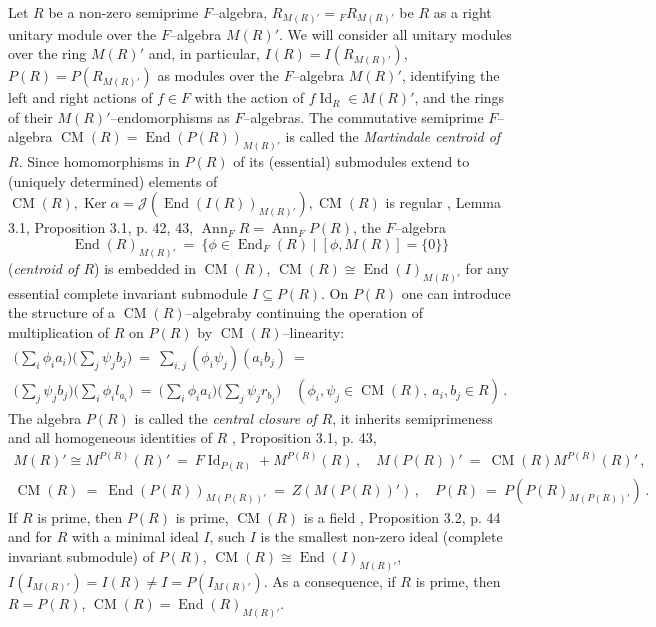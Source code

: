 \documentclass[a4paper,11pt]{article}
\DeclareMathOperator{\Id}{Id}
\DeclareMathOperator{\Ker}{Ker}
\DeclareMathOperator{\End}{End}
\DeclareMathOperator{\CM}{CM}
\DeclareMathOperator{\Ann}{Ann}
\begin{document}
Let $R$ be a non-zero semiprime $F$--algebra, ${R_{M(R)'}={}_F R_{M(R)'}}$ be 
$R$ as a right unitary module over the $F$--algebra $M(R)'$. We will consider 
all unitary modules over the ring $M(R)'$ and, in particular, 
${I(R)=I(R_{M(R)'})}$, ${P(R)=P(R_{M(R)'})}$ as modules over the $F$--algebra 
$M(R)'$, identifying the left and right actions of ${f\in F}$ with the 
action of ${f \Id_R\in M(R)'}$, and the rings of their $M(R)'$--endomorphisms 
as $F$--algebras. The commutative semiprime $F$--algebra 
${\CM(R)=\End(P(R))_{M(R)'}}$ is called the \emph{Martindale centroid of $R$}. 
Since homomorphisms in $P(R)$ of its (essential) submodules extend to 
(uniquely determined) elements of 
${\CM(R), \Ker \alpha=\mathcal{J}(\End(I(R))_{M(R)'}), \CM(R)}$ is regular 
\cite{Raz}, Lemma 3.1, Proposition 3.1, p. 42, 43, 
${\Ann_F R=\Ann_F P(R)}$, the $F$--algebra  
\[
\End(R)_{M(R)'}\ =\ \{\phi\in \End_F(R)\mid [\phi, M(R)]=\{0\}\} 
\]
(\emph{centroid of $R$}) is embedded in $\CM(R)$, 
${\CM(R)\cong \End(I)_{M(R)'}}$ for any essential complete invariant 
submodule ${I\subseteq P(R)}$. On $P(R)$ one can introduce the structure of 
a $\CM(R)$--algebra\linebreak by continuing the operation of multiplication of 
$R$ on $P(R)$ by $\CM(R)$--linearity: 
\begin{multline*}
\biggl(\sum_i \phi_i a_i\biggr) \biggl(\sum_j \psi_j b_j\biggr)\ =\ 
\sum_{i, j} (\phi_i \psi_j)(a_i b_j)\ =
\\ 
\biggl(\sum_j \psi_j b_j\biggr)\biggl(\sum_i \phi_i l_{a_i}\biggr)
\ =\ \biggl(\sum_i \phi_i a_i\biggr)\biggl(\sum_j \psi_j r_{b_j}\biggr)
\quad (\phi_i, \psi_j\in \CM(R),\ a_i, b_j\in R)\,.
\end{multline*}
The algebra $P(R)$ is called the \emph{central closure of $R$}, it inherits 
semiprimeness and all homogeneous identities of $R$ \cite{Raz}, 
Proposition 3.1, p. 43, 
\begin{gather*}
M(R)'\cong M^{P(R)}(R)'\ =\ F \Id_{P(R)}+M^{P(R)}(R)\,,\quad 
M(P(R))'\ =\ \CM(R) M^{P(R)}(R)'\,,
\\ 
\CM(R)\ =\ \End(P(R))_{M(P(R))'}\ =\ Z(M(P(R))')\,,\quad 
P(R)\ =\ P(P(R)_{M(P(R))'})\,.
\end{gather*}
If $R$ is prime, then $P(R)$ is prime, $\CM(R)$ is a field \cite{Raz}, 
Proposition 3.2, p. 44 and for $R$ with a minimal ideal $I$, such $I$ is 
the smallest non-zero ideal (complete invariant submodule) of $P(R)$, 
${\CM(R)\cong \End(I)_{M(R)'}}$, ${I(I_{M(R)'})=I(R)\ne I=P(I_{M(R)'})}$.
As a consequence, if $R$ is prime, then ${R=P(R)}$, ${\CM(R)=\End(R)_{M(R)'}}$.
\end{document}
